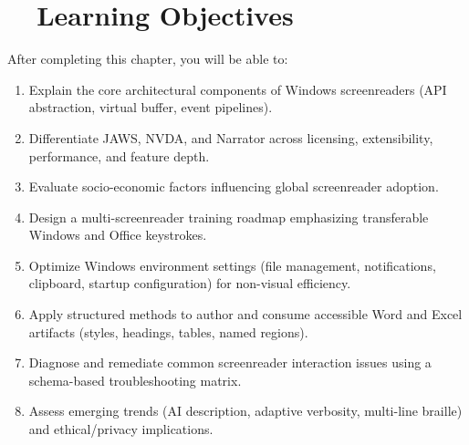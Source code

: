 \section{~~Learning Objectives}
\label{sec:sr25-learning-objectives}
After completing this chapter, you will be able to:
\begin{enumerate}
	\item Explain the core architectural components of Windows screenreaders (API abstraction, virtual buffer, event pipelines).
	\item Differentiate JAWS, NVDA, and Narrator across licensing, extensibility, performance, and feature depth.
	\item Evaluate socio-economic factors influencing global screenreader adoption.
	\item Design a multi-screenreader training roadmap emphasizing transferable Windows and Office keystrokes.
	\item Optimize Windows environment settings (file management, notifications, clipboard, startup configuration) for non-visual efficiency.
	\item Apply structured methods to author and consume accessible Word and Excel artifacts (styles, headings, tables, named regions).
	\item Diagnose and remediate common screenreader interaction issues using a schema-based troubleshooting matrix.
	\item Assess emerging trends (AI description, adaptive verbosity, multi-line braille) and ethical/privacy implications.
\end{enumerate}

